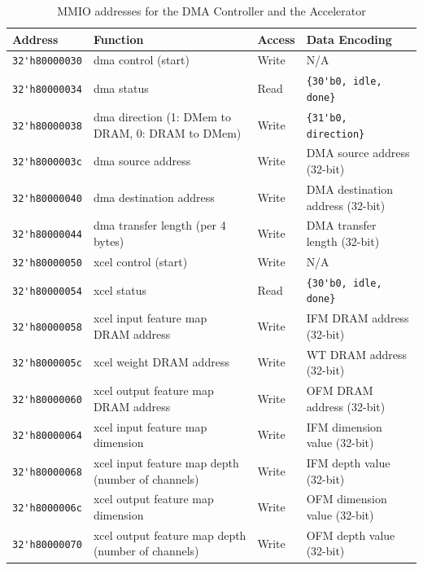 \documentclass[11pt]{article}
\begin{document}
\begin{table}[hbt]
  \begin{center}
    \caption{MMIO addresses for the DMA Controller and the Accelerator}
    \label{mem_map_dma_xcel}
    \begin{adjustbox}{width=\columnwidth,center}
    \begin{tabular}{l l l l}
      \toprule
      \textbf{Address} & \textbf{Function} & \textbf{Access} & \textbf{Data Encoding}\\
      \midrule
      \verb|32'h80000030| & dma control (start) & Write & N/A \\
      \verb|32'h80000034| & dma status & Read & \verb|{30'b0, idle, done}| \\
      \verb|32'h80000038| & dma direction (1: DMem to DRAM, 0: DRAM to DMem) & Write & \verb|{31'b0, direction}| \\
      \verb|32'h8000003c| & dma source address & Write & DMA source address (32-bit) \\
      \verb|32'h80000040| & dma destination address & Write & DMA destination address (32-bit) \\
      \verb|32'h80000044| & dma transfer length (per 4 bytes) & Write & DMA transfer length (32-bit) \\
      \verb|32'h80000050| & xcel control (start) & Write & N/A \\
      \verb|32'h80000054| & xcel status & Read & \verb|{30'b0, idle, done}| \\
      \verb|32'h80000058| & xcel input feature map DRAM address & Write & IFM DRAM address (32-bit) \\
      \verb|32'h8000005c| & xcel weight DRAM address & Write & WT DRAM address (32-bit) \\
      \verb|32'h80000060| & xcel output feature map DRAM address & Write & OFM DRAM address (32-bit) \\
      \verb|32'h80000064| & xcel input feature map dimension & Write & IFM dimension value (32-bit) \\
      \verb|32'h80000068| & xcel input feature map depth (number of channels) & Write & IFM depth value (32-bit) \\
      \verb|32'h8000006c| & xcel output feature map dimension & Write & OFM dimension value (32-bit) \\
      \verb|32'h80000070| & xcel output feature map depth (number of channels) & Write & OFM depth value (32-bit) \\
      \bottomrule
    \end{tabular}
    \end{adjustbox}
  \end{center}
\end{table}
\end{document}
